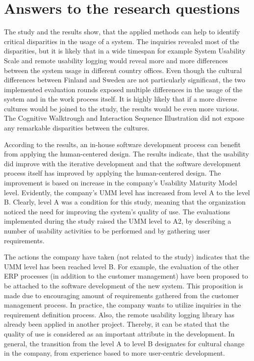\documentclass[12pt,a4paper,oneside,pdftex]{report}
\begin{document}
\section{Answers to the research questions}

The study and the results show, that the applied methods can help to identify critical disparities in the usage of a system. The inquiries revealed most of the disparities, but it is likely that in a wide timespan for example System Usability Scale and remote usability logging would reveal more and more differences between the system usage in different country offices. Even though the cultural differences between Finland and Sweden are not particularly significant, the two implemented evaluation rounds exposed multiple differences in the usage of the system and in the work process itself. It is highly likely that if a more diverse cultures would be joined to the study, the results would be even more various. The Cognitive Walktrough and Interaction Sequence Illustration did not expose any remarkable disparities between the cultures. 

According to the results, an in-house software development process can benefit from applying the human-centered design. The results indicate, that the usability did improve with the iterative development and that the software development process itself has improved by applying the human-centered design. The improvement is based on increase in the company's Usability Maturity Model level. Evidently, the company's UMM level has increased from level A to the level B. Clearly, level A was a condition for this study, meaning that the organization noticed the need for improving the system's quality of use. The evaluations implemented during the study raised the UMM level to A2, by describing a number of usability activities to be performed and by gathering user requirements. 

The actions the company have taken (not related to the study) indicates that the UMM level has been reached level B. For example, the evaluation of the other ERP processes (in addition to the customer management) have been proposed to be attached to the software development of the new system. This proposition is made due to encouraging amount of requirements gathered from the customer management process. In practice, the company wants to utilize inquiries in the requirement definition process. Also, the remote usability logging library has already been applied in another project. Thereby, it can be stated that the quality of use is considered as an important attribute in the development. In general, the transition from the level A to level B designates for cultural change in the company, from experience based to more user-centric development. 
\end{document}
